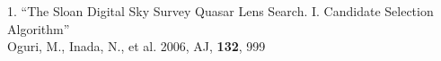 \begin{publications}


1. ``The Sloan Digital Sky Survey Quasar Lens Search. I. Candidate Selection
 Algorithm''\\
\hspace*{0.4cm} Oguri, M., Inada, N., et al. 2006, AJ, {\bf 132}, 999


\end{publications}
